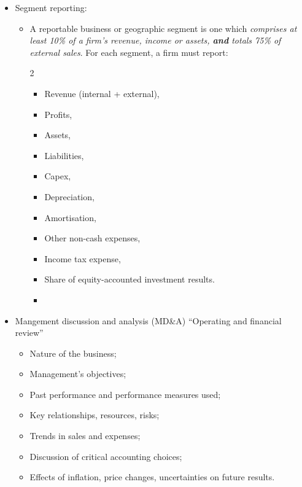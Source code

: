 \documentclass[../notes_compiled.tex]{subfiles}
\begin{document}
\begin{itemize}
\item Segment reporting:
\begin{itemize}
\item A reportable business or geographic segment is one which \emph{comprises at least 10\% of a firm's revenue, income or assets, \textbf{and} totals 75\% of external sales}. For each segment, a firm must report:
\begin{multicols}{2}
\begin{itemize}
\item Revenue (internal + external),
\item Profits,
\item Assets,
\item Liabilities,
\item Capex,
\item Depreciation,
\item Amortisation,
\item Other non-cash expenses,
\item Income tax expense,
\item Share of equity-accounted investment results.
\item[]
\end{itemize}
\end{multicols}
\end{itemize}
\item Mangement discussion and analysis (MD\&A) ``Operating and financial review''
\begin{itemize}
\item Nature of the business;
\item Management's objectives;
\item Past performance and performance measures used;
\item Key relationships, resources, risks;
\item Trends in sales and expenses;
\item Discussion of critical accounting choices;
\item Effects of inflation, price changes, uncertainties on future results.
\end{itemize}
\end{itemize}
\end{document}

